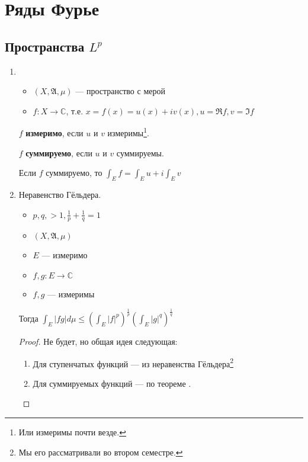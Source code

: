\section{Ряды Фурье}

\subsection{Пространства \(L^p\)}

\begin{enumerate}
    \item \begin{itemize}
              \item \((X, \mathfrak{A}, \mu)\) --- пространство с мерой
              \item \(f : X \to \mathbb C\), т.е. \(x = f(x) = u(x) + iv(x), u = \Re f, v = \Im f\)
          \end{itemize}

          \(f\) \textbf{измеримо}, если \(u\) и \(v\) измеримы\footnote{Или измеримы почти везде.}.

          \(f\) \textbf{суммируемо}, если \(u\) и \(v\) суммируемы.

          Если \(f\) суммируемо, то \(\int_E f = \int_E u + i \int_E v\)

    \item Неравенство Гёльдера.

          \begin{itemize}
              \item \(p, q, > 1, \frac{1}{p} + \frac{1}{q} = 1\)
              \item \((X, \mathfrak{A}, \mu)\)
              \item \(E\) --- измеримо
              \item \(f, g : E \to \mathbb C\)
              \item \(f, g\) --- измеримы
          \end{itemize}

          Тогда \(\int_E |fg| d\mu \leq \left( \int_E |f|^p \right)^{\frac{1}{p}} \left( \int_E |g|^q \right)^{\frac{1}{q}}\)
          \begin{proof}
              Не будет, но общая идея следующая:
              \begin{enumerate}
                  \item Для ступенчатых функций --- из неравенства Гёльдера\footnote{Мы его рассматривали во втором семестре.}
                  \item Для суммируемых функций --- по теореме .
              \end{enumerate}
          \end{proof}


\end{enumerate}
